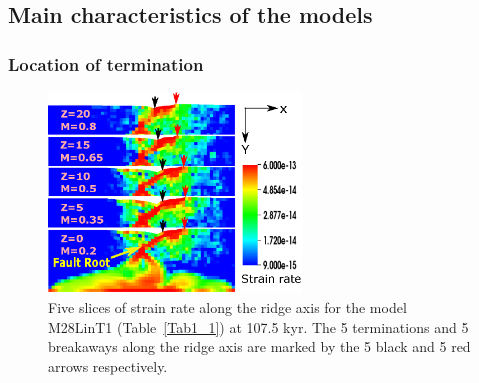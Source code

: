 \subsection{Main characteristics of the models}

\subsubsection{Location of termination}

\begin{figure}[h]
  \centering
    \includegraphics[width=0.6\textwidth]{./Figures/fig_Results1_2.eps}
  \caption{Five slices of strain rate along the ridge axis for the model M28LinT1 (Table~\hyperref[Tab1_1]{\ref{Tab1_1}}) at 107.5 kyr. The 5 terminations and 5 breakaways along the ridge axis are marked by the 5 black and 5 red arrows respectively. }
 \label{fig_Results1_2}
\end{figure}   

